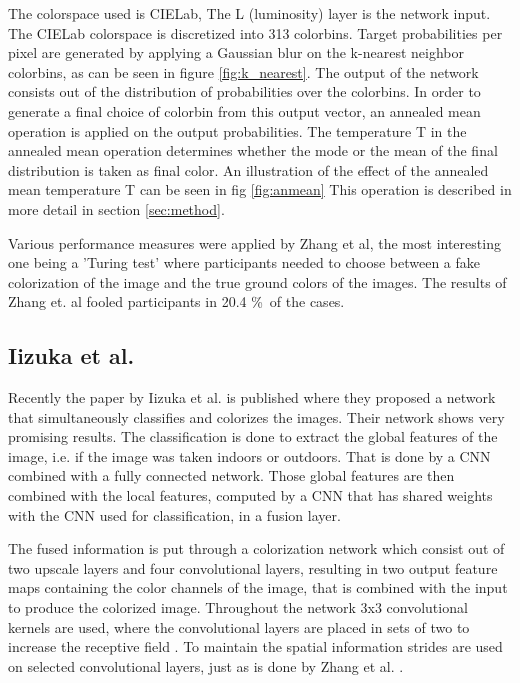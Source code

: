 The colorspace used is CIELab, The L (luminosity) layer is the network input. The CIELab colorspace is discretized into 313 colorbins. Target probabilities per pixel are generated by applying a Gaussian blur on the k-nearest neighbor colorbins, as can be seen in figure \ref{fig:k_nearest}. The output of the network consists out of the distribution of probabilities over the colorbins. In order to generate a final choice of colorbin from this output vector, an annealed mean operation is applied on the output probabilities. The temperature T in the annealed mean operation determines whether the mode or the mean of the final distribution is taken as final color. An illustration of the effect of the annealed mean temperature T can be seen in fig \ref{fig:anmean} This operation is described in more detail in section \ref{sec:method}.

Various performance measures were applied by Zhang et al, the most interesting one being a 'Turing test' where participants needed to choose between a fake colorization of the image and the true ground colors of the images. The results of Zhang et. al fooled participants in 20.4 \%\ of the cases. 



\subsection{Iizuka et al.}
Recently the paper by Iizuka et al. \cite{IizukaSIGGRAPH2016} is published where they proposed a network that simultaneously classifies and colorizes the images. Their network shows very promising results. The classification is done to extract the global features of the image, i.e. if the image was taken indoors or outdoors. That is done by a CNN combined with a fully connected network. Those global features are then combined with the local features, computed by a CNN that has shared weights with the CNN used for classification, in a fusion layer.

The fused information is put through a colorization network which consist out of two upscale layers and four convolutional layers, resulting in two output feature maps containing the color channels of the image, that is combined with the input to produce the colorized image. 
Throughout the network 3x3 convolutional kernels are used, where the convolutional layers are placed in sets of two to increase the receptive field \cite{Simonyan}. To maintain the spatial information strides are used  on selected convolutional layers, just as is done by Zhang et al. \cite{Zhang}.

